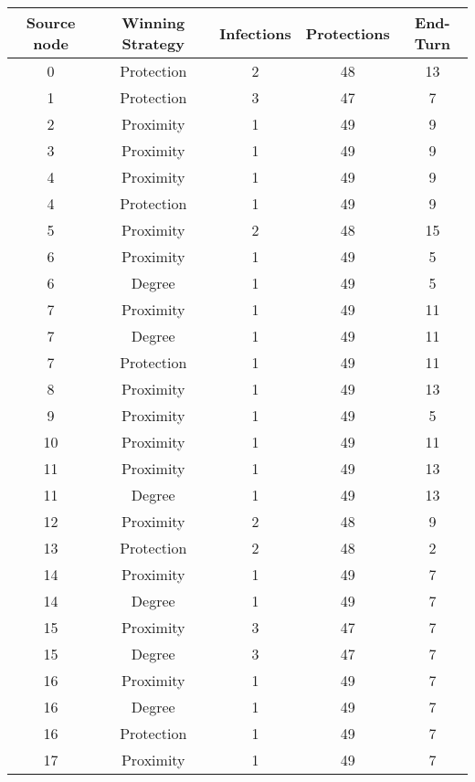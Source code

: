 \documentclass[results.tex]{subfiles}
\begin{document}
\begin{center}
  \begin{tabular}{| c || c | c | c | c |}
    \hline
    {\bfseries Source node} & {\bfseries Winning Strategy} & {\bfseries Infections} & {\bfseries Protections} & {\bfseries End-Turn} \\  %
    \hline\hline
    0 & Protection & 2 & 48 & 13 \\ 
    \hline
    1 & Protection & 3 & 47 & 7 \\ 
    \hline
    2 & Proximity & 1 & 49 & 9 \\ 
    \hline
    3 & Proximity & 1 & 49 & 9 \\ 
    \hline
    4 & Proximity & 1 & 49 & 9 \\ 
    \hline
    4 & Protection & 1 & 49 & 9 \\ 
    \hline
    5 & Proximity & 2 & 48 & 15 \\ 
    \hline
    6 & Proximity & 1 & 49 & 5 \\ 
    \hline
    6 & Degree & 1 & 49 & 5 \\ 
    \hline
    7 & Proximity & 1 & 49 & 11 \\ 
    \hline
    7 & Degree & 1 & 49 & 11 \\ 
    \hline
    7 & Protection & 1 & 49 & 11 \\ 
    \hline
    8 & Proximity & 1 & 49 & 13 \\ 
    \hline
    9 & Proximity & 1 & 49 & 5 \\ 
    \hline
    10 & Proximity & 1 & 49 & 11 \\ 
    \hline
    11 & Proximity & 1 & 49 & 13 \\ 
    \hline
    11 & Degree & 1 & 49 & 13 \\ 
    \hline
    12 & Proximity & 2 & 48 & 9 \\ 
    \hline
    13 & Protection & 2 & 48 & 2 \\ 
    \hline
    14 & Proximity & 1 & 49 & 7 \\ 
    \hline
    14 & Degree & 1 & 49 & 7 \\ 
    \hline
    15 & Proximity & 3 & 47 & 7 \\ 
    \hline
    15 & Degree & 3 & 47 & 7 \\ 
    \hline
    16 & Proximity & 1 & 49 & 7 \\ 
    \hline
    16 & Degree & 1 & 49 & 7 \\ 
    \hline
    16 & Protection & 1 & 49 & 7 \\ 
    \hline
    17 & Proximity & 1 & 49 & 7 \\ 

\end{tabular}
\end{center}
\end{document}
